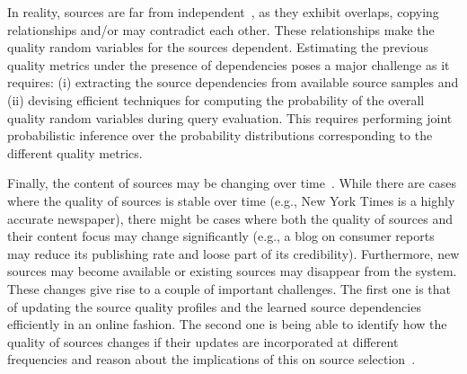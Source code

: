 \documentclass{sig-alternate}
\begin{document}
In reality, sources are far from independent~\cite{berti-equille:sailing, dong:2009,pochampally:2014}, as they exhibit overlaps, copying relationships and/or may contradict each other. These relationships make the quality random variables for the sources dependent. Estimating the previous quality metrics under the presence of dependencies poses a major challenge as it requires: (i) extracting the source dependencies from available source samples and (ii) devising efficient techniques for computing the probability of the overall quality random variables during query evaluation. This requires performing joint probabilistic inference over the probability distributions corresponding to the different quality metrics.

Finally, the content of sources may be changing over time~\cite{rekatsinas:2014}. While there are cases where the quality of sources is stable over time (e.g., New York Times is a highly accurate newspaper), there might be cases where both the quality of sources and their content focus may change significantly (e.g., a  blog on consumer reports may reduce its publishing rate and loose part of its credibility). Furthermore, new sources may become available or existing sources may disappear from the system. These changes give rise to a couple of important challenges. The first one is that of updating the source quality profiles and the learned source dependencies efficiently in an online fashion. The second one is being able to identify how the quality of sources changes if their updates are incorporated at different frequencies and reason about the implications of this on source selection~\cite{rekatsinas:2014}.

\end{document}
